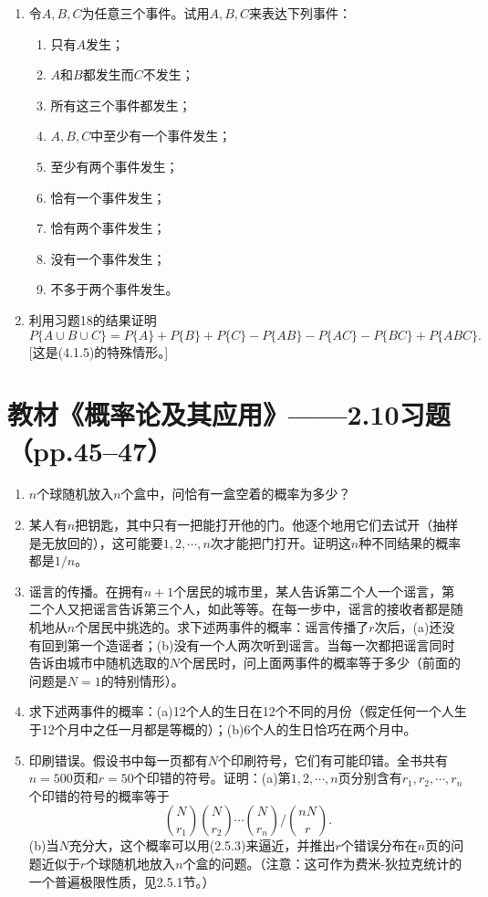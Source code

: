 \documentclass[UTF8]{ctexart}
\begin{document}
\begin{enumerate}
\item 令$A,B,C$为任意三个事件。试用$A,B,C$来表达下列事件：
\begin{enumerate}
\item[(a)] 只有$A$发生；
\item[(b)] $A$和$B$都发生而$C$不发生；
\item[(c)] 所有这三个事件都发生；
\item[(d)] $A,B,C$中至少有一个事件发生；
\item[(e)] 至少有两个事件发生；
\item[(f)] 恰有一个事件发生；
\item[(g)] 恰有两个事件发生；
\item[(h)] 没有一个事件发生；
\item[(i)] 不多于两个事件发生。
\end{enumerate}

\setcounter{enumi}{18}
\item 利用习题18的结果证明
\[
P\{A\cup B\cup C\} = P\{A\}+P\{B\}+P\{C\}-P\{AB\}-P\{AC\}-P\{BC\}+P\{ABC\}.
\]
{[这是(4.1.5)的特殊情形。]}
\end{enumerate}

\section*{教材《概率论及其应用》——2.10习题（pp.45--47）}

\begin{enumerate}
\renewcommand{\labelenumi}{\textbf{\arabic{enumi}.}}
\setcounter{enumi}{8}
\item $n$个球随机放入$n$个盒中，问恰有一盒空着的概率为多少？

\setcounter{enumi}{10}
\item 某人有$n$把钥匙，其中只有一把能打开他的门。他逐个地用它们去试开（抽样是无放回的），这可能要$1,2,\cdots,n$次才能把门打开。证明这$n$种不同结果的概率都是$1/n$。

\setcounter{enumi}{20}
\item 谣言的传播。在拥有$n+1$个居民的城市里，某人告诉第二个人一个谣言，第二个人又把谣言告诉第三个人，如此等等。在每一步中，谣言的接收者都是随机地从$n$个居民中挑选的。求下述两事件的概率：谣言传播了$r$次后，(a)还没有回到第一个造谣者；(b)没有一个人两次听到谣言。当每一次都把谣言同时告诉由城市中随机选取的$N$个居民时，问上面两事件的概率等于多少（前面的问题是$N=1$的特别情形）。

\setcounter{enumi}{23}
\item 求下述两事件的概率：(a)12个人的生日在12个不同的月份（假定任何一个人生于12个月中之任一月都是等概的）；(b)6个人的生日恰巧在两个月中。

\setcounter{enumi}{37}
\item 印刷错误。假设书中每一页都有$N$个印刷符号，它们有可能印错。全书共有$n=500$页和$r=50$个印错的符号。证明：(a)第$1,2,\cdots,n$页分别含有$r_1,r_2,\cdots,r_n$个印错的符号的概率等于
\[
\binom{N}{r_1}\binom{N}{r_2}\cdots\binom{N}{r_n}\Big/\binom{nN}{r}.
\]
(b)当$N$充分大，这个概率可以用(2.5.3)来逼近，并推出$r$个错误分布在$n$页的问题近似于$r$个球随机地放入$n$个盒的问题。（注意：这可作为费米-狄拉克统计的一个普遍极限性质，见2.5.1节。）
\end{enumerate}
\end{document}
